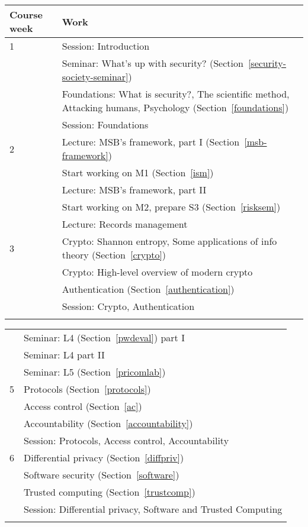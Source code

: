 	\centering
  \begin{tabular}{lp{9cm}}
    \toprule
    \textbf{Course week}	& \textbf{Work} \\
    \midrule
    1
      & Session: Introduction\\
      & Seminar: What's up with security? (Section~\ref{security-society-seminar})\\
      & Foundations: What is security?, The scientific method, Attacking 
      humans, Psychology (Section~\ref{foundations})\\
      & Session: Foundations\\
    \midrule
    2
      & Lecture: MSB's framework, part I (Section~\ref{msb-framework})\\
      & Start working on M1 (Section~\ref{ism})\\
      & Lecture: MSB's framework, part II\\
      & Start working on M2, prepare S3 (Section~\ref{risksem})\\
      & Lecture: Records management\\
    \midrule
    3
      & Crypto: Shannon entropy, Some applications of info theory 
      (Section~\ref{crypto})\\
      & Crypto: High-level overview of modern crypto\\
      & Authentication (Section~\ref{authentication})\\
      & Session: Crypto, Authentication\\
    \midrule
\mode<presentation>{%
  \end{tabular}
  \begin{tabular}{lp{9cm}}
}%
    4
      & Seminar: L4 (Section~\ref{pwdeval}) part I\\
      & Seminar: L4 part II\\
      & Seminar: L5 (Section~\ref{pricomlab})\\
    \midrule
    5
      & Protocols (Section~\ref{protocols})\\
      & Access control (Section~\ref{ac})\\
      & Accountability (Section~\ref{accountability})\\
      & Session: Protocols, Access control, Accountability\\
    \midrule
    6
      & Differential privacy (Section~\ref{diffpriv})\\
      & Software security (Section~\ref{software})\\
      & Trusted computing (Section~\ref{trustcomp})\\
      & Session: Differential privacy, Software and Trusted Computing\\
    \midrule
\mode<presentation>{%
  \end{tabular}
